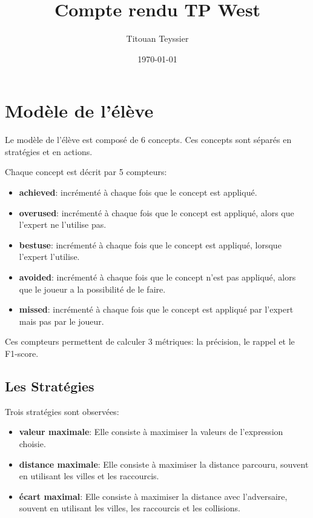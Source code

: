\documentclass[a4paper, 12pt]{article}
\begin{document}
\title{Compte rendu TP West}
\author{Titouan Teyssier}
\date{\today}
\maketitle

\tableofcontents
\newpage
{}


\section{Modèle de l'élève}
Le modèle de l'élève est composé de 6 concepts. Ces concepts sont séparés en stratégies et en actions.

Chaque concept est décrit par 5 compteurs:
\begin{itemize}
	\item \textbf{achieved}: incrémenté à chaque fois que le concept est appliqué.
	\item \textbf{overused}: incrémenté à chaque fois que le concept est appliqué, alors que l'expert ne l'utilise pas.
	\item \textbf{bestuse}: incrémenté à chaque fois que le concept est appliqué, lorsque l'expert l'utilise.
	\item \textbf{avoided}: incrémenté à chaque fois que le concept n'est pas appliqué, alors que le joueur a la possibilité de le faire.
	\item \textbf{missed}: incrémenté à chaque fois que le concept est appliqué par l'expert mais pas par le joueur.
\end{itemize}

Ces compteurs permettent de calculer 3 métriques: la précision, le rappel et le F1-score.

\subsection{Les Stratégies}
Trois stratégies sont observées:
\begin{itemize}
	\item \textbf{valeur maximale}: Elle consiste à maximiser la valeurs de l'expression choisie.
	\item \textbf{distance maximale}: Elle consiste à maximiser la distance parcouru, souvent en utilisant les villes et les raccourcis.
	\item \textbf{écart maximal}: Elle consiste à maximiser la distance avec l'adversaire, souvent en utilisant les villes, les raccourcis et les collisions.
\end{itemize}
\end{document}
